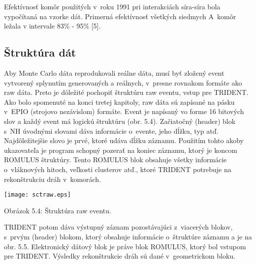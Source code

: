 Efektívnosť komôr použitých v~roku 1991 pri interakciách síra-síra bola
vypočítaná na vzorke dát. Primerná efektívnosť všetkých siedmych A~komôr  
ležala v intervale 83\% - 95\% [5].

\subsection{Štruktúra  dát}
Aby Monte Carlo dáta reprodukovali reálne dáta, musí byť zložený event
vytvorený splynutím generovaných a reálnych, v~presne rovnakom formáte ako
raw dáta. Preto je dôležité pochopiť štruktúru raw eventu, vstup pre
TRIDENT. Ako bolo spomenuté na konci tretej kapitoly, raw dáta sú zapísané na
pásku  v~EPIO (strojovo nezávislom) formáte. Event je napísaný vo forme 16
bitových slov a každý event má logickú štruktúru (obr. 5.4).
Začiatočný (header) blok s~NH úvodnými slovami dáva informácie o~evente,
jeho dĺžku, typ atď. Najdôležitejšie slovo je prvé, ktoré udáva dĺžku
záznamu. Použitím tohto akoby ukazovateľa je program schopný pozerať na
koniec záznamu, ktorý je  koncom ROMULUS štruktúry. Tento ROMULUS
blok obsahuje všetky informácie o~vláknových hitoch, veľkosti clusterov atď.,
ktoré TRIDENT potrebuje na rekonštrukciu dráh v~komorách. 
\begin{center}
  \texttt{[image: sctraw.eps]}
\end{center}
\begin{center}
  Obrázok 5.4: Štruktúra raw eventu.
\end{center}
TRIDENT potom dáva výstupný záznam pozostávajúci z~viacerých blokov, s~prvým
(header) blokom, ktorý obsahuje informácie o~štruktúre záznamu a je na obr.
5.5.  Elektronický dátový blok je práve blok ROMULUS, ktorý bol
vstupom pre TRIDENT. Výsledky rekonštrukcie dráh sú dané v~geometrickom
bloku.

